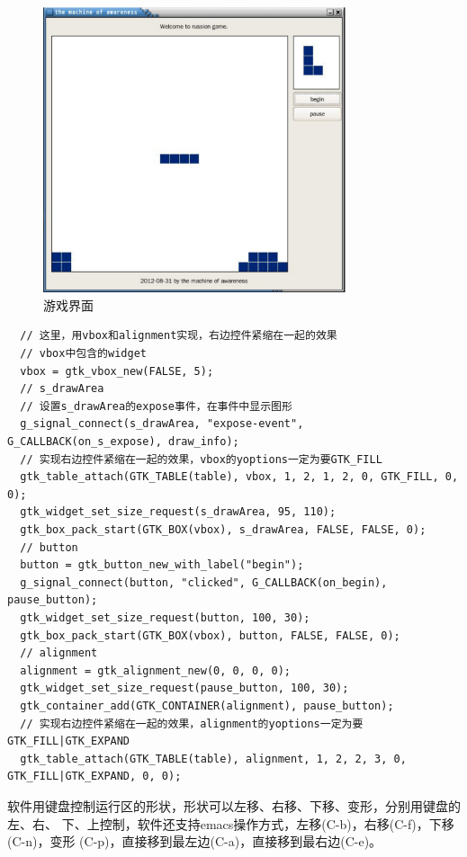 \begin{figure}[htbp]
  \centering
  \includegraphics[width=3.5in]{images/russian}
  \caption{游戏界面}
  \label{fig:russian}
\end{figure}

\begin{shell}
\begin{verbatim}
  // 这里，用vbox和alignment实现，右边控件紧缩在一起的效果
  // vbox中包含的widget
  vbox = gtk_vbox_new(FALSE, 5);
  // s_drawArea
  // 设置s_drawArea的expose事件，在事件中显示图形
  g_signal_connect(s_drawArea, "expose-event", G_CALLBACK(on_s_expose), draw_info);
  // 实现右边控件紧缩在一起的效果，vbox的yoptions一定为要GTK_FILL
  gtk_table_attach(GTK_TABLE(table), vbox, 1, 2, 1, 2, 0, GTK_FILL, 0, 0);    
  gtk_widget_set_size_request(s_drawArea, 95, 110);
  gtk_box_pack_start(GTK_BOX(vbox), s_drawArea, FALSE, FALSE, 0);
  // button
  button = gtk_button_new_with_label("begin");
  g_signal_connect(button, "clicked", G_CALLBACK(on_begin), pause_button);
  gtk_widget_set_size_request(button, 100, 30);
  gtk_box_pack_start(GTK_BOX(vbox), button, FALSE, FALSE, 0);
  // alignment
  alignment = gtk_alignment_new(0, 0, 0, 0);
  gtk_widget_set_size_request(pause_button, 100, 30);
  gtk_container_add(GTK_CONTAINER(alignment), pause_button);
  // 实现右边控件紧缩在一起的效果，alignment的yoptions一定为要GTK_FILL|GTK_EXPAND
  gtk_table_attach(GTK_TABLE(table), alignment, 1, 2, 2, 3, 0, GTK_FILL|GTK_EXPAND, 0, 0);
\end{verbatim}
\end{shell}

软件用键盘控制运行区的形状，形状可以左移、右移、下移、变形，分别用键盘的左、右、
下、上控制，软件还支持emacs操作方式，左移(C-b)，右移(C-f)，下移(C-n)，变形
(C-p)，直接移到最左边(C-a)，直接移到最右边(C-e)。

